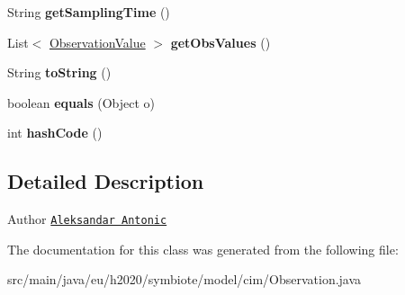 \begin{DoxyCompactItemize}
String {\bfseries get\+Sampling\+Time} ()
\item 
\mbox{\label{classeu_1_1h2020_1_1symbiote_1_1model_1_1cim_1_1Observation_a69654af49261b1cded2bd3b05bb7132f}} 
List$<$ \hyperlink{classeu_1_1h2020_1_1symbiote_1_1model_1_1cim_1_1ObservationValue}{Observation\+Value} $>$ {\bfseries get\+Obs\+Values} ()
\item 
\mbox{\label{classeu_1_1h2020_1_1symbiote_1_1model_1_1cim_1_1Observation_a3fc3d07b9b7630ac7c587fcd830ee080}} 
String {\bfseries to\+String} ()
\item 
\mbox{\label{classeu_1_1h2020_1_1symbiote_1_1model_1_1cim_1_1Observation_a956405000633e2fd11b62f5112f1a064}} 
boolean {\bfseries equals} (Object o)
\item 
\mbox{\label{classeu_1_1h2020_1_1symbiote_1_1model_1_1cim_1_1Observation_a88a074f14f5a5901edc4e7b247960745}} 
int {\bfseries hash\+Code} ()
\end{DoxyCompactItemize}


\subsection{Detailed Description}
\begin{DoxyAuthor}{Author}
\href{mailto:aleksandar.antonic@fer.hr}{\tt Aleksandar Antonic} 
\end{DoxyAuthor}


The documentation for this class was generated from the following file\+:\begin{DoxyCompactItemize}
\item 
src/main/java/eu/h2020/symbiote/model/cim/Observation.\+java\end{DoxyCompactItemize}
